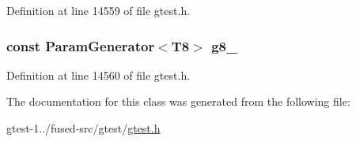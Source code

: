 \-Definition at line 14559 of file gtest.\-h.

\hypertarget{classtesting_1_1internal_1_1CartesianProductGenerator8_afbac9ea419b43f592302c2d32cc25209}{
\subsubsection[{g8\-\_\-}]{\setlength{\rightskip}{0pt plus 5cm}const {\bf \-Param\-Generator}$<$\-T8$>$ {\bf g8\-\_\-}}}\label{df/dcc/classtesting_1_1internal_1_1CartesianProductGenerator8_afbac9ea419b43f592302c2d32cc25209}


\-Definition at line 14560 of file gtest.\-h.



\-The documentation for this class was generated from the following file\-:\begin{DoxyCompactItemize}
\item 
gtest-\/1../fused-\/src/gtest/\hyperlink{fused-src_2gtest_2gtest_8h}{gtest.\-h}\end{DoxyCompactItemize}
